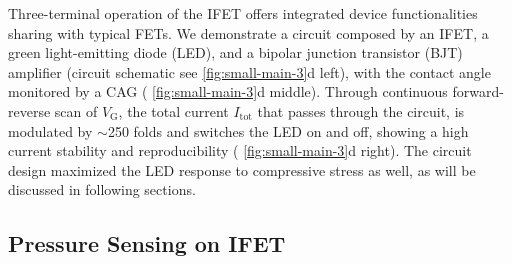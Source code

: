 Three-terminal operation of the IFET offers integrated
device functionalities sharing with typical FETs. We demonstrate a
circuit composed by an IFET, a green light-emitting diode (LED), and a
bipolar junction transistor (BJT) amplifier (circuit schematic see
\autoref{fig:small-main-3}d left), with the contact angle monitored by
a CAG ( \autoref{fig:small-main-3}d middle). Through continuous
forward-reverse scan of \(V_{\mathrm{G}}\), the total current
\(I_{\mathrm{tot}}\) that passes through the circuit, is modulated by
\(\sim\)250 folds and switches the LED on and off, showing a high
current stability and reproducibility ( \autoref{fig:small-main-3}d
right). The circuit design maximized the LED response to compressive
stress as well, as will be
discussed in following sections.

\subsection{Pressure Sensing on IFET}
\label{sec:press-sens-ifet}


